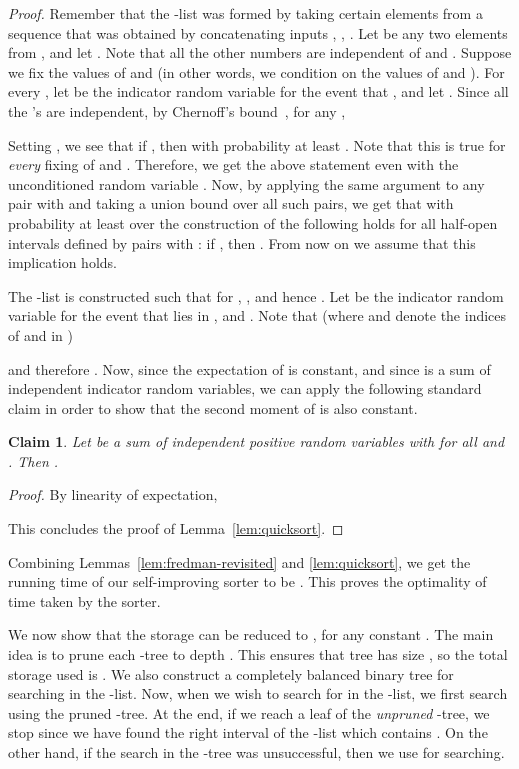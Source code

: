\documentclass{siamltex}
\newtheorem{claim}[theorem]{Claim}
\begin{document}
\begin{proof} 
Remember that the -list was formed by taking certain elements from a 
sequence  that was
obtained by concatenating  inputs 
, , .
Let  be any two elements from , and
let .
Note that all the other  numbers are
independent of  and .  Suppose we fix the values of  and 
(in other words, we condition on the values of  and ). For every 
, let
 be the indicator random variable for the event that 
, and let .  
Since all the
's are independent, by Chernoff's 
bound~\cite[Theorem~4.2]{MotwaniRa95}, for any
,  

Setting , we see that
 if ,
then  with probability at least
.
Note that this is true for \emph{every} fixing of  and .
Therefore, we get the above statement even with the unconditioned
random variable .
Now, by applying  the same argument
to any pair  with  and taking a union bound over all
 such pairs, we get that with probability at 
least  over the construction of 
the following holds for all half-open intervals  defined by pairs 
 with :
if , then
. From now on we assume that this 
implication holds.

The -list is constructed such that for , , and hence 
.  Let  be the indicator random 
variable 
for the event that  lies in , and .  Note that (where  and  denote the indices of 
 and  in )

and therefore . Now, since the expectation of  is constant, and
since  is a sum of independent indicator random variables,
we can apply the following standard claim in order to show that the
second moment of  is also constant.
\medskip
\begin{claim}\label{clm:indicator-square}
Let  be a sum of independent positive random variables with
 for all  and . Then .
\end{claim}

\emph{Proof.}
By linearity of expectation,

This concludes the proof of Lemma~\ref{lem:quicksort}.
\end{proof}
\medskip

Combining Lemmas~\ref{lem:fredman-revisited} and \ref{lem:quicksort}, 
we get the running time
of our self-improving sorter to be .
This proves the optimality of time taken by the sorter.

We now show that the
storage can be reduced to ,
for any constant . The main idea is to prune each 
-tree to depth . This ensures that 
tree has size , so the total storage used is
. We also construct a completely balanced binary
tree  for searching in the -list. Now, when we wish to search
for  in the -list, we first search using the pruned -tree.
At the end, if we reach a leaf of the \emph{unpruned} -tree,
we stop since we have found the right interval of the -list
which contains . On the other hand, if the search in the -tree
was unsuccessful, then we use  for searching.
\end{document}
